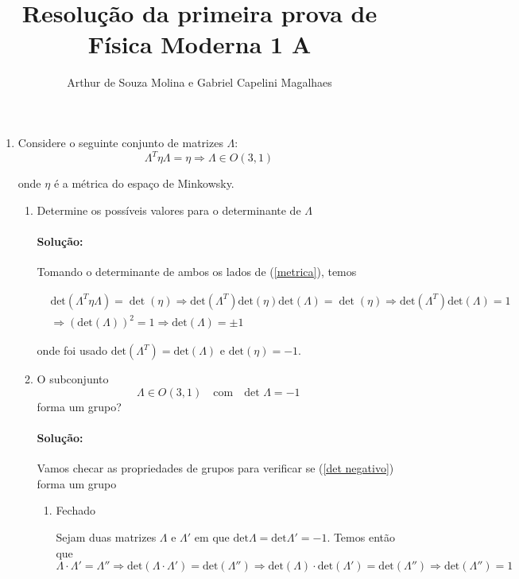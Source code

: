 \documentclass[10pt,a4paper]{article}
\author{Arthur de Souza Molina e Gabriel Capelini Magalhaes}
\title{Resolução da primeira prova de Física Moderna 1 A}
\begin{document}
	\maketitle
	
	\begin{enumerate}
	\item Considere o seguinte conjunto de matrizes $\Lambda$: 
	\begin{equation} \label{metrica}
	\Lambda^{T} \eta \Lambda = \eta \Rightarrow \Lambda \in O(3,1)
	\end{equation}
	
	onde $\eta$ é a métrica do espaço de Minkowsky. 
	\begin{enumerate}
	\item Determine os possíveis valores para o determinante de $\Lambda$
	\paragraph{Solução:} Tomando o determinante de ambos os lados de (\ref{metrica}), temos 
	
	\begin{equation}
\begin{split}
	&\text{det}(\Lambda^{T} \eta \Lambda) = \det(\eta) \Rightarrow \text{det}(\Lambda^{T})\text{det}(\eta)\text{det}(\Lambda) = \det(\eta)\Rightarrow \text{det}(\Lambda^{T})\text{det}(\Lambda) = 1 \\ 
	&\Rightarrow (\text{det}(\Lambda))^2 = 1 \Rightarrow \text{det}(\Lambda) = \pm 1	
	\end{split}
	\end{equation}
	
	onde foi usado $\text{det}(\Lambda^T) = \text{det}(\Lambda)$ e $\text{det}(\eta) = -1$.
	\item O subconjunto
	\begin{equation} \label{det negativo}
	\Lambda \in O(3,1) \quad \text{com} \quad \text{det }\Lambda = -1
	\end{equation}
	forma um grupo?
	
	\paragraph{Solução:} Vamos checar as propriedades de grupos para verificar se (\ref{det negativo}) forma um grupo
	\begin{enumerate}
	\item Fechado 
	
	Sejam duas matrizes $\Lambda$ e $\Lambda'$ em que $\text{det}\Lambda = \text{det}\Lambda' = -1$. Temos então que 
	\begin{equation}
	\Lambda \cdot \Lambda' = \Lambda'' \Rightarrow \text{det}(\Lambda \cdot \Lambda') = \text{det}(\Lambda''	) \Rightarrow \text{det}(\Lambda)\cdot \text{det}(\Lambda') = \text{det}(\Lambda'') \Rightarrow \text{det}(\Lambda'') = 1
	\end{equation}
	

\end{enumerate}
\end{enumerate}
\end{enumerate}
\end{document}
